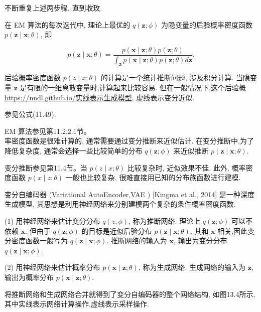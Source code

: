 \documentclass[10pt]{article}
\begin{document}
不断重复上述两步骤, 直到收玫.

在 EM 算法的每次迭代中, 理论上最优的 $q(\boldsymbol{z} ; \phi)$ 为隐变量的后验概率密度函数 $p(\boldsymbol{z} \mid \boldsymbol{x} ; \theta)$, 即


\begin{equation*}
p(\boldsymbol{z} \mid \boldsymbol{x} ; \theta)=\frac{p(\boldsymbol{x} \mid \boldsymbol{z} ; \theta) p(\boldsymbol{z} ; \theta)}{\int_{\boldsymbol{z}} p(\boldsymbol{x} \mid \boldsymbol{z} ; \theta) p(\boldsymbol{z} ; \theta) d \boldsymbol{z}} . \tag{13.5}
\end{equation*}


后验概率密度函数 $p(z \mid x ; \theta)$ 的计算是一个统计推断问题, 涉及积分计算. 当隐变量 $\boldsymbol{z}$ 是有限的一维离散变量时,计算起来比较容易. 但在一般情况下,这个后验概 \href{https://nndl.github.io/%E5%AE%9E%E7%BA%BF%E8%A1%A8%E7%A4%BA%E7%94%9F%E6%88%90%E6%A8%A1%E5%9E%8B}{https://nndl.github.io/实线表示生成模型}, 虚线表示变分近似.

参见公式(11.49).

EM 算法参见第11.2.2.1节。\\
率密度函数是很难计算的, 通常需要通过变分推断来近似估计. 在变分推断中,为了降低复杂度, 通常会选择一些比较简单的分布 $q(\boldsymbol{z} ; \phi)$ 来近似推断 $p(\boldsymbol{z} \mid \boldsymbol{x} ; \theta)$.

变分推断参见第11.4节。当 $p(z \mid x ; \theta)$ 比较复杂时, 近似效果不佳. 此外, 概率密度函数 $p(x \mid z ; \theta)$ 一般也比较复杂, 很难直接用已知的分布族函数进行建模.

变分自编码器 (Variational AutoEncoder,VAE ) [Kingma et al., 2014] 是一种深度生成模型, 其思想是利用神经网络来分别建模两个复杂的条件概率密度函数.

(1) 用神经网络来估计变分分布 $q(z ; \phi)$, 称为推断网络. 理论上 $q(\boldsymbol{z} ; \phi)$ 可以不依赖 $\boldsymbol{x}$. 但由于 $q(\boldsymbol{z} ; \phi)$ 的目标是近似后验分布 $p(\boldsymbol{z} \mid \boldsymbol{x} ; \theta)$, 其和 $\boldsymbol{x}$ 相关,因此变分密度函数一般写为 $q(\boldsymbol{z} \mid \boldsymbol{x} ; \phi)$. 推断网络的输入为 $\boldsymbol{x}$, 输出为变分分布 $q(\boldsymbol{z} \mid \boldsymbol{x} ; \phi)$.

(2) 用神经网络来估计概率分布 $p(\boldsymbol{x} \mid \boldsymbol{z} ; \theta)$, 称为生成网络. 生成网络的输入为 $\boldsymbol{z}$, 输出为概率分布 $p(\boldsymbol{x} \mid \boldsymbol{z} ; \theta)$.

将推断网络和生成网络合并就得到了变分自编码器的整个网络结构, 如图13.4所示,其中实线表示网络计算操作,虚线表示采样操作.
\end{document}
